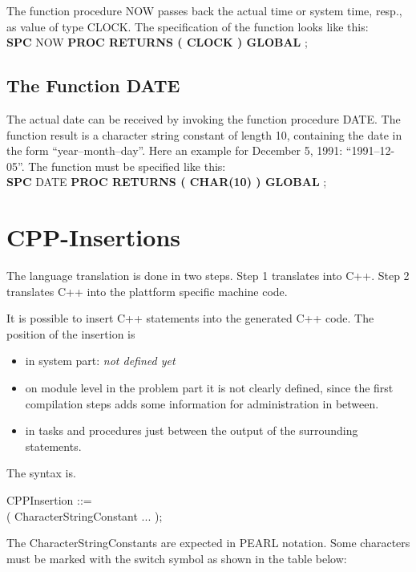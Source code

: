 The function procedure NOW passes back the actual time or system time, resp., 
as value of type CLOCK. The specification of the function looks like this:\\

{\bf SPC} NOW {\bf PROC RETURNS ( CLOCK ) GLOBAL} ; 


\subsection{The Function DATE}    %

The actual date can be received by invoking the function procedure DATE.
The function result is a character string constant of length 10, containing
the date in the form ``year--month--day''. Here an example for December 5,
1991: ``1991--12-05''. The function must  be specified like this:\\

{\bf SPC} DATE {\bf PROC RETURNS ( CHAR(10) ) GLOBAL} ;

\section{CPP-Insertions}
The language translation is done in two steps.
Step 1 translates \OpenPEARL{} into C++.
Step 2 translates C++ into the plattform specific machine code.

It is possible to insert C++ statements into the generated C++ 
code. The position of the insertion is
\begin{discuss}
\begin{itemize}
\item in system part: {\em not defined yet}
\item on module level in the problem part 
   it is not clearly defined, since the first compilation
   steps adds some information for administration in between.
\item in tasks and procedures just between the output of the surrounding
statements.
\end{itemize}
\end{discuss}

The syntax is.

CPPInsertion ::=\\
 ( CharacterStringConstant ... );

The CharacterStringConstants are expected in PEARL notation.
Some characters must be marked with the switch symbol as shown in the table
below:

